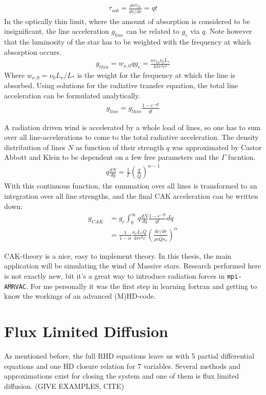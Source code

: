 \begin{align}
\tau_{sob} = \frac{\rho \kappa v_{th}}{dv/dr} = qt
\end{align}
In the optically thin limit, where the amount of absorption is considered to be insignificant, the line acceleration $g_{line}$ can be related to $g_e$ via $q$. Note however that the luminosity of the star has to be weighted with the frequency at which absorption occurs. 
\begin{align}
g_{thin} = w_{\nu,0} q g_e = \frac{\kappa v_{th} \nu_0 L_*}{4 \pi r^2 c^2}
\end{align}
Where $w_{\nu,0} = \nu_0 L_\nu / L_*$ is the weight for the frequency at which the line is absorbed. Using solutions for the radiative transfer equation, the total line acceleration can be formulated analytically.
\begin{align}
g_{line} = g_{thin} \frac{1 - e^{-qt}}{qt} 
\end{align}

A radiation driven wind is accelerated by a whole load of lines, so one has to sum over all line-accelerations to come to the total radiative acceleration. The density distribution of lines $N$ as function of their strength $q$ was approximated by Castor Abbott and Klein to be dependent on a few free parameters and the $\Gamma$ fucntion.
\begin{align} 
q \frac{dN}{dq} = \frac{1}{\Gamma} \left(\frac{q}{\bar{Q}} \right)^{\alpha - 1}
\end{align}
With this continuous function, the summation over all lines is transformed to an integration over all line strengths, and the final CAK acceleration can be written down:
\begin{align}
g_{CAK} &= g_e \int_0^\infty q \frac{dN}{dq} \frac{1 - e^{-qt}}{qt} dq \\
        &= \frac{1}{1-\alpha} \frac{\kappa_e L_* \bar{Q}}{4\pi r^2 c} \left( \frac{dv/dr}{\rho c \bar{Q} \kappa_e} \right)^\alpha \label{g_CAK}
\end{align}

CAK-theory is a nice, easy to implement theory. In this thesis, the main application will be simulating the wind of Massive stars. Research performed here is not exactly new, bit it's a great way to introduce radiation forces in \texttt{mpi-AMRVAC}. For me personally it was the first step in learning fortran and getting to know the workings of an advanced (M)HD-code.


\section{Flux Limited Diffusion} \label{section: introduction Flux Limited Diffusion}
As mentioned before, the full RHD equations leave us with 5 partial differential equations and one HD closure relation for 7 variables. Several methods and approximations exist for closing the system and one of them is flux limited diffusion. (GIVE EXAMPLES, CITE)\\


